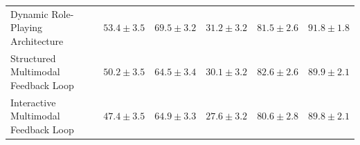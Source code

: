 \begin{table}[h]
{\begin{tabular}{>{\raggedright}p{7cm}c|cccc}
        Dynamic Role-Playing Architecture & \rule{0pt}{2.2ex}$\mathbf{53.4 \pm 3.5}$ & $\mathbf{69.5 \pm 3.2}$ & $\mathbf{31.2 \pm 3.2}$ & $81.5 \pm 2.6$ & $\mathbf{91.8 \pm 1.8}$ \\
        Structured Multimodal Feedback Loop & \rule{0pt}{2.2ex}$50.2 \pm 3.5$ & $64.5 \pm 3.4$ & $30.1 \pm 3.2$ & $\mathbf{82.6 \pm 2.6}$ & $89.9 \pm 2.1$ \\
        Interactive Multimodal Feedback Loop & \rule{0pt}{2.2ex}$47.4 \pm 3.5$ & $64.9 \pm 3.3$ & $27.6 \pm 3.2$ & $80.6 \pm 2.8$ & $89.8 \pm 2.1$ \\
        \bottomrule
    \end{tabular}}
    \label{tab:transfer_dataset}
\end{table}

\begin{table}[h]
    \centering
    \caption{\textbf{Performance across multiple domains when transferring top agents from the Math (MGSM) domain to non-math domains.} Agents discovered by \ouralgo in the math domain can outperform or match the performance of baselines after being transferred to domains beyond math. We report the test accuracy and the 95\% bootstrap confidence interval.}
\end{table}
